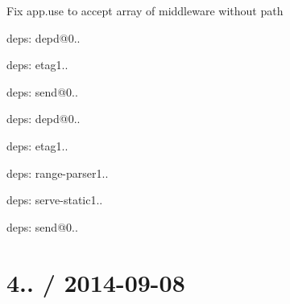 {\ttfamily }

{\ttfamily 
\begin{DoxyItemize}
\item Fix {\ttfamily app.\+use} to accept array of middleware without path
\item deps\+: depd@0..
\item deps\+: etag1..
\item deps\+: send@0..
\begin{DoxyItemize}
\item deps\+: depd@0..
\item deps\+: etag1..
\item deps\+: range-\/parser1..
\end{DoxyItemize}
\item deps\+: serve-\/static1..
\begin{DoxyItemize}
\item deps\+: send@0..
\end{DoxyItemize}
\end{DoxyItemize}}

{\ttfamily \section*{4.. / 2014-\/09-\/08 }}

{\ttfamily }

